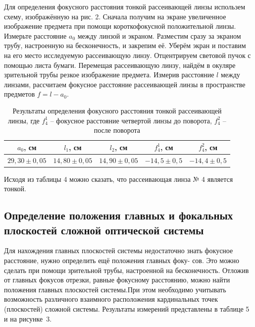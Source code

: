 \documentclass[a4paper]{article}
\begin{document}
    \noindent Для определения фокусного расстояния тонкой рассеивающей линзы использем схему, изображённую на рис. 2. Сначала получим на экране увеличенное изображение предмета при помощи короткофокусной положительной линзы. Измерьте расстояние $a_0$ между линзой и экраном. Разместим сразу за экраном трубу, настроенную на бесконечность, и закрепим её. Уберём экран и поставим на его место исследуемую рассеивающую линзу. Отцентрируем световой пучок с помощью листа бумаги. Перемещая рассеивающую линзу, найдём в окуляре зрительной трубы резкое изображение предмета. Измерив расстояние $l$ между линзами, рассчитаем фокусное расстояние рассеивающей линзы в пространстве предметов $f = l - a_0$.

    \begin{table}[!ht]
        \centering
        \caption{Результаты определения фокусного расстояния тонкой рассеивающей линзы, где $f_4^1$ -- фокусное расстояние четвертой линзы до поворота, $f_4^2$ -- после поворота}
        \begin{tabular}{|c|c|c|c|c|}
        \hline
        $a_0$, см        & $l_1$, см        & $l_2$, см        & $f_4^1$, см     & $f_4^2$, см     \\ \hline
        $29,30 \pm 0,05$ & $14,80 \pm 0,05$ & $14,90 \pm 0,05$ & $-14,5 \pm 0,5$ & $-14,4 \pm 0,5$ \\ \hline
        \end{tabular}
        \end{table}

    \noindent Исходя из таблицы 4 можно сказать, что рассеивающая линза № 4 является тонкой.

    \newpage

    \subsection{Определение положения главных и фокальных плоскостей сложной оптической системы}

    Для нахождения главных плоскостей системы недостаточно знать
    фокусное расстояние, нужно определить ещё положения главных фоку-
    сов. Это можно сделать при помощи зрительной трубы, настроенной на
    бесконечность. Отложив от главных фокусов отрезки, равные фокусному расстоянию, можно найти положения главных плоскостей системы.При этом необходимо учитывать возможность различного взаимного расположения кардинальных точек (плоскостей) сложной системы. Результаты измерений представлены в таблице 5 и на рисунке~3.
\end{document}
